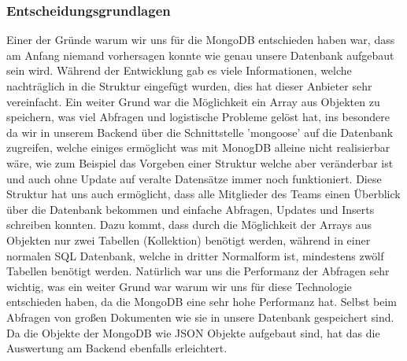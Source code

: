 \subsubsection{Entscheidungsgrundlagen}
Einer der Gründe warum wir uns für die MongoDB entschieden haben war, dass am Anfang niemand vorhersagen konnte wie genau unsere Datenbank aufgebaut sein wird. 
Während der Entwicklung gab es viele Informationen, welche nachträglich in die Struktur eingefügt wurden, dies hat dieser Anbieter sehr vereinfacht. 
Ein weiter Grund war die Möglichkeit ein Array aus Objekten zu speichern, was viel Abfragen und logistische Probleme gelöst hat, ins besondere da wir in unserem Backend über die Schnittstelle 'mongoose' auf 
die Datenbank zugreifen, welche einiges ermöglicht was mit MonogDB alleine nicht realisierbar wäre, wie zum Beispiel das Vorgeben einer Struktur welche aber veränderbar ist und auch ohne Update auf veralte Datensätze immer noch funktioniert. 
Diese Struktur hat uns auch ermöglicht, dass alle Mitglieder des Teams einen Überblick über die Datenbank bekommen und einfache Abfragen, Updates und Inserts schreiben konnten. 
Dazu kommt, dass durch die Möglichkeit der Arrays aus Objekten nur zwei Tabellen (Kollektion) benötigt werden, während in einer normalen SQL Datenbank, welche in dritter Normalform ist, mindestens zwölf Tabellen benötigt werden. 
Natürlich war uns die Performanz der Abfragen sehr wichtig, was ein weiter Grund war warum wir uns für diese Technologie entschieden haben, da die MongoDB eine sehr hohe Performanz hat. Selbst beim Abfragen von großen Dokumenten wie sie in unsere Datenbank gespeichert sind. 
Da die Objekte der MongoDB wie JSON Objekte aufgebaut sind, hat das die Auswertung am Backend ebenfalls erleichtert.
\newpage
